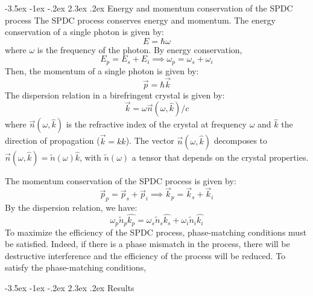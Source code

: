 \documentclass[a4paper, 12pt,oneside]{article}
\makeatletter
\renewcommand{\section}{\@startsection {section}{1}{\z@}%
             {-3.5ex \@plus -1ex \@minus -.2ex}%
             {2.3ex \@plus.2ex}%
             {\normalfont\normalsize\bfseries}}
\renewcommand{\subsection}{\@startsection {subsection}{1}{\z@}%
             {-3.5ex \@plus -1ex \@minus -.2ex}%
             {2.3ex \@plus.2ex}%
             {\normalfont\normalsize\bfseries}}
\makeatother
\begin{document}
\subsection{Energy and momentum conservation of the SPDC process}
The SPDC process conserves energy and momentum. The energy conservation of a single photon is given by:
\begin{equation}
    E = \hbar \omega 
\end{equation}
where $\omega$ is the frequency of the photon. By energy conservation,
\begin{equation}
    E_p = E_s + E_i \implies \omega_p = \omega_s + \omega_i
\end{equation}
Then, the momentum of a single photon is given by:
\begin{equation}
    \vec{p} = \hbar \vec{k}
\end{equation}
The dispersion relation in a birefringent crystal is given by:
\begin{equation}
    \vec{k} = \omega \vec{n}(\omega,\hat{k})/c
\end{equation} 
where $\vec{n}(\omega,\hat{k})$ is the refractive index of the crystal at frequency $\omega$ and $\hat{k}$  the direction of propagation ($\vec{k} = k \hat{k}$). The vector $\vec{n}(\omega,\hat{k})$ decomposes to $\vec{n}(\omega,\hat{k}) = \tilde{n}(\omega) \hat{k}$, with $\tilde{n}(\omega)$ a tensor that depends on the crystal properties. 

The momentum conservation of the SPDC process is given by:
\begin{equation}
    \vec{p}_p = \vec{p}_s + \vec{p}_i \implies \vec{k}_p = \vec{k}_s + \vec{k}_i
\end{equation}
By the dispersion relation, we have:
\begin{equation}
    \omega_p \tilde{n}_p \hat{k_p} = \omega_s \tilde{n}_s \hat{k_s} + \omega_i \tilde{n}_i \hat{k_i}
\end{equation}
To maximize the efficiency of the SPDC process, phase-matching conditions must be satisfied. Indeed, if there is a phase mismatch in the process, there will be destructive interference and the efficiency of the process will be reduced. To satisfy the phase-matching conditions, 


\section{Results}
\end{document}
